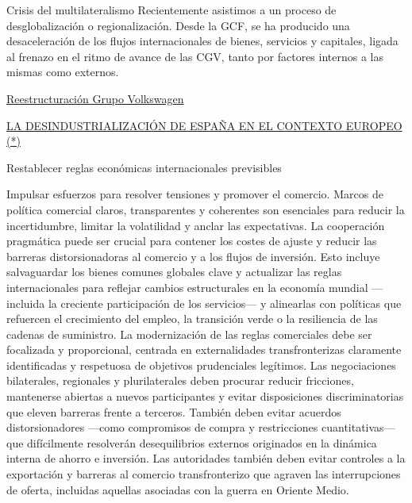 \documentclass[10pt,a4paper]{article}
\begin{document}
Crisis del multilateralismo Recientemente asistimos a un proceso de desglobalización o regionalización. Desde la GCF, se ha producido una desaceleración de los flujos internacionales de bienes, servicios y capitales, ligada al frenazo en el ritmo de avance de las CGV, tanto por factores internos a las mismas como externos.


\href{https://www.elmundo.es/motor/2026/06/26/6a3e5750e9cf4a68468b45a5.html}{Reestructuración Grupo Volkswagen}

\href{https://www.funcas.es/wp-content/uploads/Migracion/Articulos/FUNCAS_PEE/144art04.pdf}{LA DESINDUSTRIALIZACIÓN DE ESPAÑA EN EL CONTEXTO EUROPEO (*)}






Restablecer reglas económicas internacionales previsibles

Impulsar esfuerzos para resolver tensiones y promover el comercio. Marcos de política comercial claros, transparentes y coherentes son esenciales para reducir la incertidumbre, limitar la volatilidad y anclar las expectativas. La cooperación pragmática puede ser crucial para contener los costes de ajuste y reducir las barreras distorsionadoras al comercio y a los flujos de inversión. Esto incluye salvaguardar los bienes comunes globales clave y actualizar las reglas internacionales para reflejar cambios estructurales en la economía mundial —incluida la creciente participación de los servicios— y alinearlas con políticas que refuercen el crecimiento del empleo, la transición verde o la resiliencia de las cadenas de suministro. La modernización de las reglas comerciales debe ser focalizada y proporcional, centrada en externalidades transfronterizas claramente identificadas y respetuosa de objetivos prudenciales legítimos. Las negociaciones bilaterales, regionales y plurilaterales deben procurar reducir fricciones, mantenerse abiertas a nuevos participantes y evitar disposiciones discriminatorias que eleven barreras frente a terceros. También deben evitar acuerdos distorsionadores —como compromisos de compra y restricciones cuantitativas— que difícilmente resolverán desequilibrios externos originados en la dinámica interna de ahorro e inversión. Las autoridades también deben evitar controles a la exportación y barreras al comercio transfronterizo que agraven las interrupciones de oferta, incluidas aquellas asociadas con la guerra en Oriente Medio.
\end{document}
